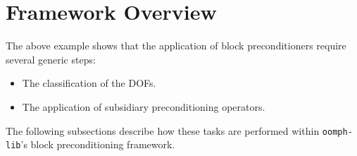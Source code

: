 \section{ Framework Overview\label{sec:framework_overview}}
The above example shows that the application of block preconditioners
require several generic steps:
\begin{itemize}
\item The classification of the DOFs.
\item The application of subsidiary preconditioning operators.
\end{itemize}
The following subsections describe how these tasks are performed
within \verb+oomph-lib+'s block preconditioning framework.

